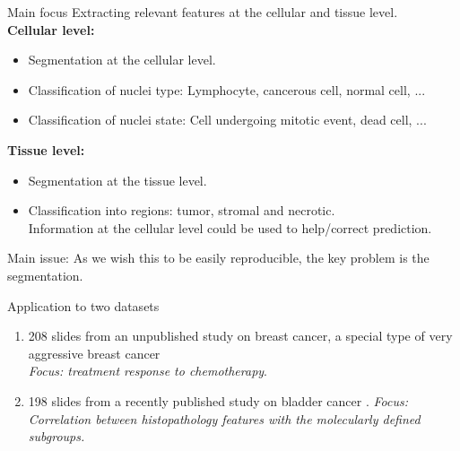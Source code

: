 \documentclass{beamer}
\begin{document}
\begin{frame}{Main focus}
 Extracting relevant features at the cellular and tissue
level. \\
\textbf{Cellular level:}
\begin{itemize}
\item Segmentation at the cellular level. 
\item Classification of nuclei type: Lymphocyte, cancerous cell, normal cell, ...
\item Classification of nuclei state: Cell undergoing mitotic event, dead cell, ...
\end{itemize}

\textbf{Tissue level:}
\begin{itemize}
\item Segmentation at the tissue level.
\item Classification into regions: tumor,
stromal and necrotic. \\
Information at the cellular level could be used to help/correct prediction.
\end{itemize}

Main issue: As we wish this to be easily reproducible, the key problem is the segmentation.
\end{frame}

\begin{frame}{Application to two datasets}
\begin{enumerate}
\item 208 slides from an unpublished study on breast
cancer, a special type of very aggressive breast cancer  \\
\emph{Focus: treatment response to chemotherapy}.
\item 198
slides from a recently published study on bladder cancer .
\emph{Focus: Correlation between histopathology features with the
molecularly defined subgroups.}
\end{enumerate}
\end{frame} 
\end{document}
